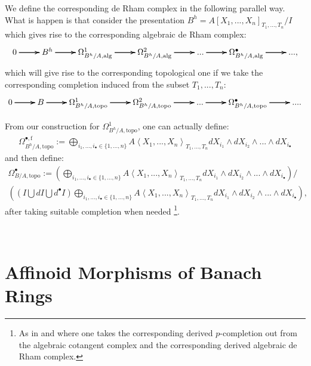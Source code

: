 \documentclass[12pt]{amsart}
\theoremstyle{definition}
\numberwithin{equation}{section}
\begin{document}
We define the corresponding de Rham complex in the following parallel way. What is happen is that consider the presentation $B^h=A[X_1,...,X_n]_{T_1,...,T_n}/I$ which gives rise to the corresponding algebraic de Rham complex:
\[
\xymatrix@C+0pc@R+0pc{
0\ar[r]\ar[r]\ar[r] &B^h \ar[r]\ar[r]\ar[r] & \Omega^1_{B^h/A,\mathrm{alg}}\ar[r]\ar[r]\ar[r] & \Omega^2_{B^h/A,\mathrm{alg}}  \ar[r]\ar[r]\ar[r] &...\ar[r]\ar[r]\ar[r] & \Omega^\bullet_{B^h/A,\mathrm{alg}} \ar[r]\ar[r]\ar[r] &..., 
}
\]
which will give rise to the corresponding topological one if we take the corresponding completion induced from the subset $T_1,...,T_n$:
\[
\xymatrix@C+0pc@R+0pc{
0\ar[r]\ar[r]\ar[r] &B \ar[r]\ar[r]\ar[r] & {\Omega}^1_{B^h/A,\mathrm{topo}}\ar[r]\ar[r]\ar[r] & {\Omega}^2_{B^h/A,\mathrm{topo}}  \ar[r]\ar[r]\ar[r] &...\ar[r]\ar[r]\ar[r] & {\Omega}^\bullet_{B^h/A,\mathrm{topo}} \ar[r]\ar[r]\ar[r] &.... 
}
\]	

From our construction for ${\Omega}^1_{B^h/A,\mathrm{topo}}$, one can actually define:
\begin{align}
{\Omega}^{\bullet,\mathrm{f}}_{B^h/A,\mathrm{topo}}:=\bigoplus_{i_1,...,i_\bullet\in \{1,...,n\}}A\left<X_1,...,X_n\right>_{T_1,...,T_n} dX_{i_1}\wedge dX_{i_2}\wedge...\wedge dX_{i_\bullet}
\end{align}
and then define:
\begin{align}
{\Omega}^{\bullet}_{B/A,\mathrm{topo}}:=\left(\bigoplus_{i_1,...,i_\bullet\in \{1,...,n\}}A\left<X_1,...,X_n\right>_{T_1,...,T_n} dX_{i_1}\wedge dX_{i_2}\wedge...\wedge dX_{i_\bullet}\right)\slash\\
\left((I\bigcup dI \bigcup d^\bullet I)\bigoplus_{i_1,...,i_\bullet\in \{1,...,n\}}A\left<X_1,...,X_n\right>_{T_1,...,T_n} dX_{i_1}\wedge dX_{i_2}\wedge...\wedge dX_{i_\bullet}\right),
\end{align}
after taking suitable completion when needed \footnote[1]{As in \cite{B1} and \cite{GL} where one takes the corresponding derived $p$-completion out from the algebraic cotangent complex and the corresponding derived algebraic de Rham complex.}. 













\


\section{Affinoid Morphisms of Banach Rings}
\end{document}
